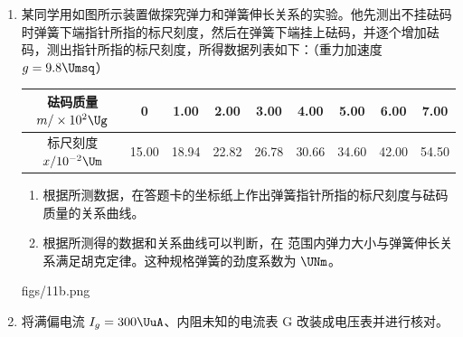 \documentclass[\gkver]{gaokaozhenti}
\begin{document}
\begin{enumerate}

{$W_{1}<W_{2}$}
{$E_{kB}>E_{kC}$}
{$E_{kB}<E_{kC}$}


\item
某同学用如图所示装置做探究弹力和弹簧伸长关系的实验。他先测出不挂砝码时弹簧下端指针所指的标尺刻度，然后在弹簧下端挂上砝码，并逐个增加砝码，测出指针所指的标尺刻度，所得数据列表如下：（重力加速度 $g=9.8\Umsq$）

\begin{center}
\begin{tabular}{|c|c|c|c|c|c|c|c|c|}
\hline
砝码质量 $m/\times10^{2}\Ug$ & 0 & 1.00 & 2.00 & 3.00 & 4.00 & 5.00 & 6.00 & 7.00 \\
\hline
标尺刻度 $x/10^{-2}\Um$ & 15.00 & 18.94 & 22.82 & 26.78 & 30.66 & 34.60 & 42.00 & 54.50 \\
\hline
\end{tabular}
\end{center}

\begin{enumerate}
	\item
	根据所测数据，在答题卡的坐标纸上作出弹簧指针所指的标尺刻度与砝码质量的关系曲线。

	\item
	根据所测得的数据和关系曲线可以判断，在  范围内弹力大小与弹簧伸长关系满足胡克定律。这种规格弹簧的劲度系数为  $\UNm$。
\end{enumerate}

{figs/11b.png}


\item
将满偏电流 $I_{g}=300\UuA$、内阻未知的电流表 G 改装成电压表并进行核对。


\end{enumerate}
\end{document}
